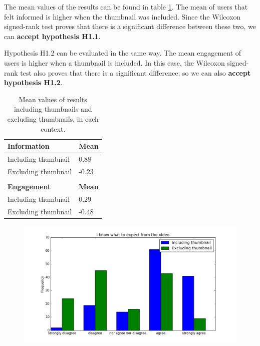 \documentclass{../resources/sig-alternate-05-2015}
\begin{document}
The mean values of the results can be found in table \ref{with without table}. The mean of users that felt informed is higher when the thumbnail was included. Since the Wilcoxon signed-rank test proves that there is a significant difference between these two, we can \textbf{accept hypothesis H1.1}.

Hypothesis H1.2 can be evaluated in the same way. The mean engagement of users is higher when a thumbnail is included. In this case, the Wilcoxon signed-rank test also proves that there is a significant difference, so we can also \textbf{accept hypothesis H1.2}.


\begin{table}[h]
\caption{Mean values of results including thumbnails and excluding thumbnails, in each context.}
\label{with without table}
\begin{tabular}{@{}ll@{}}
\textbf{Information} & \textbf{Mean}  \\ \midrule
Including thumbnail      & 0.88           \\
Excluding thumbnail      & -0.23          \\ \\
\textbf{Engagement}  & \textbf{Mean}      \\ \midrule
Including thumbnail      & 0.29           \\
Excluding thumbnail      & -0.48
\end{tabular}
\end{table}

\begin{figure}[h]
	\label{information with without}
	\includegraphics[width=\linewidth]{resources/information_with_without}
\end{figure}
\end{document}
